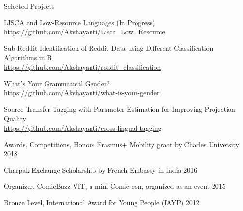 \documentclass{resume} %
\begin{document}

\begin{rSection}{Selected Projects}

    {LISCA and Low-Resource Languages (In Progress)}\\
        \url{https://github.com/Akshayanti/Lisca_Low_Resource}

    {Sub-Reddit Identification of Reddit Data using Different Classification Algorithms in R}\\
        \url{https://github.com/Akshayanti/reddit_classification}

    {What's Your Grammatical Gender?}\\
        \url{https://github.com/Akshayanti/what-is-your-gender}

    {Source Transfer Tagging with Parameter Estimation for Improving Projection Quality}\\
        \url{https://github.com/Akshayanti/cross-lingual-tagging}

\end{rSection}


\begin{rSection}{Awards, Competitions, Honors}
    {Erasmus+ Mobility grant by Charles University} \hfill
        {2018}

    {Charpak Exchange Scholarship by French Embassy in India} \hfill
        {2016}

    {Organizer, ComicBuzz VIT, a mini Comic-con, organized as an event} \hfill
        {2015}

    {Bronze Level, International Award for Young People (IAYP)} \hfill
        {2012}
\end{rSection}


\end{document}
